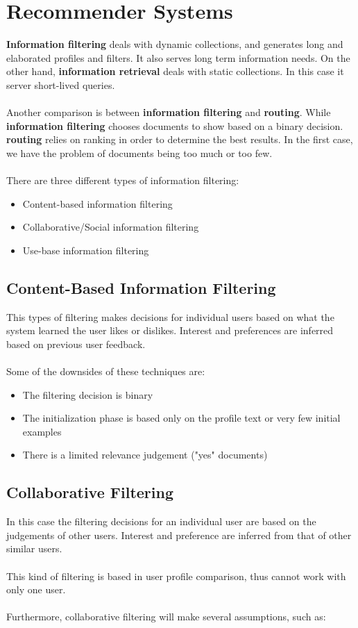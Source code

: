 \documentclass{article}
\begin{document}
\section{Recommender Systems}
\textbf{Information filtering} deals with dynamic collections, and generates long and elaborated profiles and filters. It also serves long term information needs. On the other hand, \textbf{information retrieval} deals with static collections. In this case it server short-lived queries. \\ \\
Another comparison is between \textbf{information filtering} and \textbf{routing}. While \textbf{information filtering} chooses documents to show based on a binary decision. \textbf{routing} relies on ranking in order to determine the best results. In the first case, we have the problem of documents being too much or too few. \\ \\
There are three different types of information filtering:

\begin{itemize}
	\item Content-based information filtering
	\item Collaborative/Social information filtering
	\item Use-base information filtering
\end{itemize}

\subsection{Content-Based Information Filtering}
This types of filtering makes decisions for individual users based on what the system learned the user likes or dislikes. Interest and preferences are inferred based on previous user feedback. \\ \\
Some of the downsides of these techniques are:

\begin{itemize}
	\item The filtering decision is binary
	\item The initialization phase is based only on the profile text or very few initial examples
	\item There is a limited relevance judgement ("yes" documents)
\end{itemize}

\subsection{Collaborative Filtering}
In this case the filtering decisions for an individual user are based on the judgements of other users. Interest and preference are inferred from that of other similar users. \\ \\
This kind of filtering is based in user profile comparison, thus cannot work with only one user. \\ \\
Furthermore, collaborative filtering will make several assumptions, such as:
\end{document}
